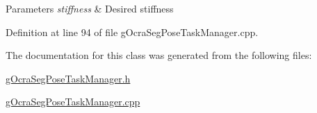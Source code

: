 \begin{DoxyParams}{Parameters}
{\em stiffness} & Desired stiffness \\
\hline
\end{DoxyParams}


Definition at line 94 of file g\+Ocra\+Seg\+Pose\+Task\+Manager.\+cpp.



The documentation for this class was generated from the following files\+:\begin{DoxyCompactItemize}
\item 
\hyperlink{gOcraSegPoseTaskManager_8h}{g\+Ocra\+Seg\+Pose\+Task\+Manager.\+h}\item 
\hyperlink{gOcraSegPoseTaskManager_8cpp}{g\+Ocra\+Seg\+Pose\+Task\+Manager.\+cpp}\end{DoxyCompactItemize}
